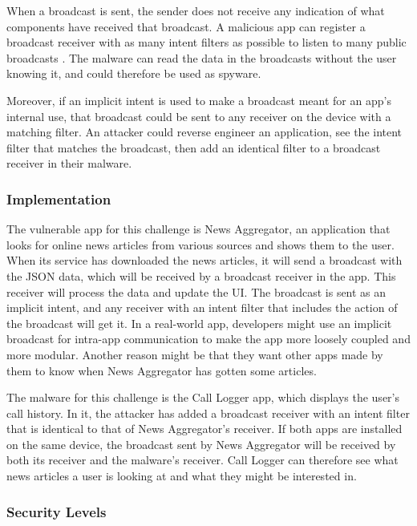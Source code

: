     When a broadcast is sent, the sender does not receive any indication of what components have received that broadcast. A malicious app can register a broadcast receiver with as many intent filters as possible to listen to many public broadcasts \cite{2010_icc_paper}. The malware can read the data in the broadcasts without the user knowing it, and could therefore be used as spyware. 
    
    Moreover, if an implicit intent is used to make a broadcast meant for an app’s internal use, that broadcast could be sent to any receiver on the device with a matching filter. An attacker could reverse engineer an application, see the intent filter that matches the broadcast, then add an identical filter to a broadcast receiver in their malware.
    
    \subsubsection{Implementation}
        \label{subsubsec:broadcast_theft_implementation}
        
    The vulnerable app for this challenge is News Aggregator, an application that looks for online news articles from various sources and shows them to the user. When its service has downloaded the news articles, it will send a broadcast with the JSON data, which will be received by a broadcast receiver in the app. This receiver will process the data and update the UI. The broadcast is sent as an implicit intent, and any receiver with an intent filter that includes the action of the broadcast will get it. In a real-world app, developers might use an implicit broadcast for intra-app communication to make the app more loosely coupled and more modular. Another reason might be that they want other apps made by them to know when News Aggregator has gotten some articles.

    The malware for this challenge is the Call Logger app, which displays the user's call history. In it, the attacker has added a broadcast receiver with an intent filter that is identical to that of News Aggregator's receiver. If both apps are installed on the same device, the broadcast sent by News Aggregator will be received by both its receiver and the malware's receiver. Call Logger can therefore see what news articles a user is looking at and what they might be interested in.
    
    \subsubsection{Security Levels}
        \label{subsubsec:broadcast_theft_security_levels}
    

